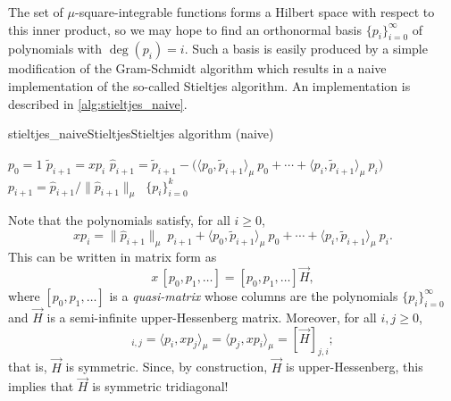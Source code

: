 The set of \( \mu \)-square-integrable functions forms a Hilbert space with respect to this inner product, so we may hope to find an orthonormal basis \( \{ p_i \}_{i=0}^{\infty} \) of polynomials with \( \deg(p_i) = i \). \label{def:OP}
Such a basis is easily produced by a simple modification of the Gram-Schmidt algorithm which results in a naive implementation of the so-called Stieltjes algorithm.
An implementation is described in \cref{alg:stieltjes_naive}.

\begin{labelalgorithm}[H]{stieltjes_naive}{Stieltjes}{Stieltjes algorithm (naive)}
\begin{algorithmic}[1]
    \State \( p_0 = 1 \)
        \State \( \tilde{p}_{i+1} = x p_i \)
        \State \( \hat{p}_{i+1} = \tilde{p}_{i+1} - \big(\langle p_0, \tilde{p}_{i+1} \rangle_\mu\: p_0  +  \cdots + \langle p_{i}, \tilde{p}_{i+1} \rangle_\mu\: p_i \big) \)
        \State \( p_{i+1} = \hat{p}_{i+1} / \| \hat{p}_{i+1} \|_\mu\: \)
    \EndFor
    \State \Return \( \{ p_i \}_{i=0}^{k} \) 
\EndProcedure
\end{algorithmic}
\end{labelalgorithm}

Note that the polynomials satisfy, for all \( i\geq 0 \),
\begin{equation}
    \label{eqn:all_term_recurrence}
    x p_i = \| \hat{p}_{i+1} \|_\mu\: p_{i+1} + \langle p_0, \tilde{p}_{i+1} \rangle_\mu\: p_0  +  \cdots + \langle p_{i}, \tilde{p}_{i+1} \rangle_\mu\: p_i.
\end{equation}
This can be written in matrix form as
\begin{equation*}
x\, [p_0, p_1, \ldots ] = [p_0, p_1, \ldots ] \vec{H},
\end{equation*}
where \( [p_0, p_1, \ldots ] \) is a \emph{quasi-matrix} whose columns are the polynomials \( \{ p_i \}_{i=0}^{\infty} \) and \( \vec{H} \) is a semi-infinite upper-Hessenberg matrix.
Moreover, for all \( i,j \geq 0 \),
\begin{equation*}
    [\vec{H}]_{i,j} = \langle p_i, x p_j \rangle_\mu  = \langle p_j, x p_i \rangle_\mu = [\vec{H}]_{j,i};
\end{equation*}
that is, \( \vec{H} \) is symmetric. 
Since, by construction, \( \vec{H} \) is upper-Hessenberg, this implies that \( \vec{H} \) is symmetric tridiagonal!

